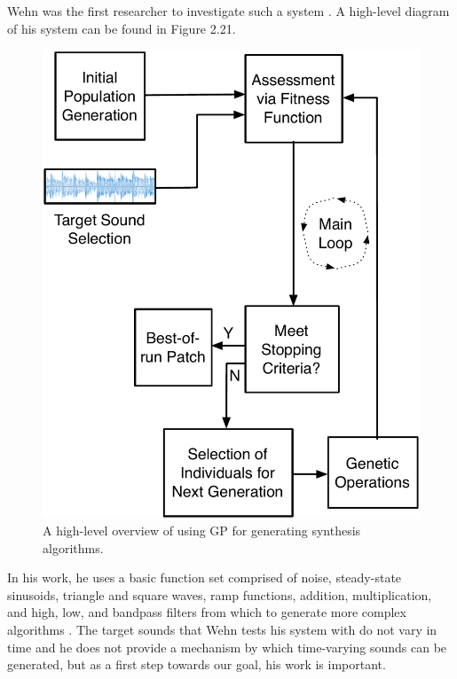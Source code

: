 \documentclass[12pt]{report} 	%
\numberwithin{figure}{chapter}
\numberwithin{table}{chapter}
\numberwithin{equation}{chapter}
\begin{document}
\begin{flushleft}
Wehn was the first researcher to investigate such a system \cite{Wehn:1998bh}. A high-level diagram of his system can be found in Figure 2.21.
\begin{figure}[h!]
\begin{center}
\includegraphics[scale = 0.6]{SimpleSystem}
\caption[GP for sound synthesis]{A high-level overview of using GP for generating synthesis algorithms.}
\end{center}
\end{figure}
In his work, he uses a basic function set comprised of noise, steady-state sinusoids, triangle and square waves, ramp functions, addition, multiplication, and high, low, and bandpass filters from which to generate more complex algorithms \cite[p. 2]{Wehn:1998bh}. The target sounds that Wehn tests his system with do not vary in time and he does not provide a mechanism by which time-varying sounds can be generated, but as a first step towards our goal, his work is important.


\end{flushleft}
\end{document}
